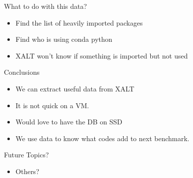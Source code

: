 \documentclass{beamer}
\begin{document}
\begin{frame}{What to do with this data?}
  \begin{itemize}
    \item Find the list of heavily imported packages
    \item Find who is using conda python
    \item XALT won't know if something is imported but not used
  \end{itemize}
\end{frame}


\begin{frame}{Conclusions}
  \begin{itemize}
    \item We can extract useful data from XALT
    \item It is not quick on a VM.
    \item Would love to have the DB on SSD
    \item We use data to know what codes add to next benchmark.
  \end{itemize}
\end{frame}


\begin{frame}{Future Topics?}
  \begin{itemize}
    \item Others?
  \end{itemize}
\end{frame}
%

%
\end{document}

